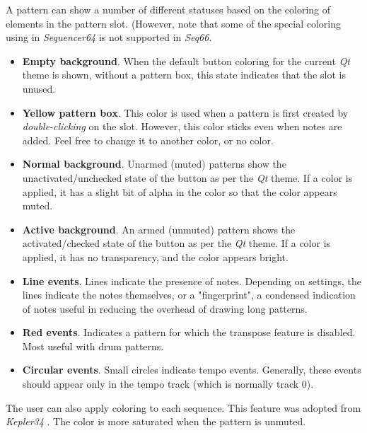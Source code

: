    A pattern can show a number of different statuses based on the coloring
   of elements in the pattern slot.
   (However, note that some of the special coloring using in
   \textsl{Sequencer64} is not supported in \textsl{Seq66}.

   \begin{itemize}
      \item \textbf{Empty background}.
         When the default button coloring for
         the current \textsl{Qt} theme is shown, without a pattern box,
         this state indicates that the slot is unused.
      \item \textbf{Yellow pattern box}.
         This color is used when a pattern is
         first created by \textsl{double-clicking} on the slot.
         However, this color sticks even when notes are added.
         Feel free to change it to another color, or no color.
      \item \textbf{Normal background}.
         Unarmed (muted) patterns show the
         unactivated/unchecked state of the button as per the \textsl{Qt}
         theme.  If a color is applied, it has a slight bit of alpha in the
         color so that the color appears muted.
      \item \textbf{Active background}.
         An armed (unmuted) pattern shows the
         activated/checked state of the button as per the \textsl{Qt}
         theme.  If a color is applied, it has no transparency, and the 
         color appears bright.
      \item \textbf{Line events}.
         Lines indicate the presence of notes.  Depending on settings, the
         lines indicate the notes themselves, or a "fingerprint", a condensed
         indication of notes useful in reducing the overhead of
         drawing long patterns.
      \item \textbf{Red events}.
         Indicates a pattern for which the transpose feature is
         disabled.  Most useful with drum patterns.
      \item \textbf{Circular events}.
         Small circles indicate tempo events.  Generally, these events should
         appear only in the tempo track (which is normally track 0).
   \end{itemize}

   The user can also apply coloring to each sequence.
   This feature was adopted from \textsl{Kepler34} \cite{kepler34}.
   The color is more saturated when the pattern is unmuted.

